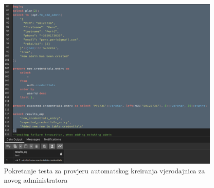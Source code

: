 				\begin{figure}[H]
					\centering
					\includegraphics[width=\textwidth]{slike/unit_tests/ut_2/credentials_creation.png}
					\caption{Pokretanje testa za provjeru automatskog kreiranja vjerodajnica za novog administratora}
					\label{fig: IS2-kreirane vjerodajnice za novod administratora}
				\end{figure}
